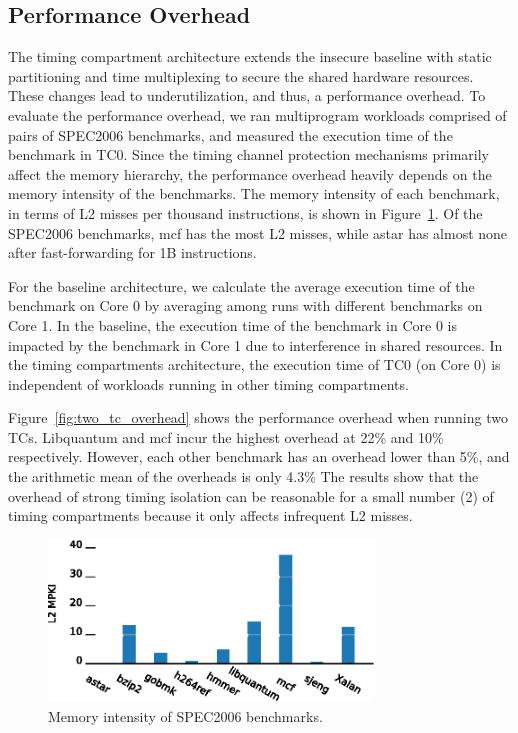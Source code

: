\subsection{Performance Overhead}

The timing compartment architecture extends the insecure baseline with
static partitioning and time multiplexing to secure the shared hardware 
resources. These changes lead to underutilization, and thus, a performance
overhead. To evaluate the performance overhead, we ran multiprogram workloads 
comprised of pairs of SPEC2006 benchmarks, and measured the execution time of
the benchmark in TC0.
Since the timing channel protection mechanisms primarily affect the 
memory hierarchy, the performance overhead heavily depends on the memory intensity 
of the benchmarks.
The memory intensity of each benchmark, in terms of L2 misses per thousand 
instructions, is shown in
Figure~\ref{fig:memstudy}. Of the SPEC2006 benchmarks, mcf has the most L2 misses,
while astar has almost none after fast-forwarding for 1B instructions.

For the baseline architecture, we calculate the average execution time of the 
benchmark on Core 0 by averaging among runs with different benchmarks on Core 
1.  In the baseline, the execution time of the benchmark in Core 0 is impacted by the benchmark 
in Core 1 due to interference in shared resources. 
In the timing compartments architecture, the execution time of TC0 
(on Core 0) is independent of workloads running in other timing compartments.

Figure~\ref{fig:two_tc_overhead} shows the performance overhead when running 
two TCs. Libquantum and mcf incur the highest overhead at 22\% and 10\% 
respectively. However, each other benchmark has an overhead lower than 5\%, and 
the arithmetic mean of the overheads is only 4.3\%
The results show that the overhead of strong timing isolation can be reasonable
for a small number (2) of timing compartments because it only affects infrequent
L2 misses.

\begin{figure}
    \begin{center}
        \includegraphics[width=3.4in]{figs/MPKI.eps}
        \caption{Memory intensity of SPEC2006 benchmarks.}
        \label{fig:memstudy}
    \end{center}
\end{figure}

